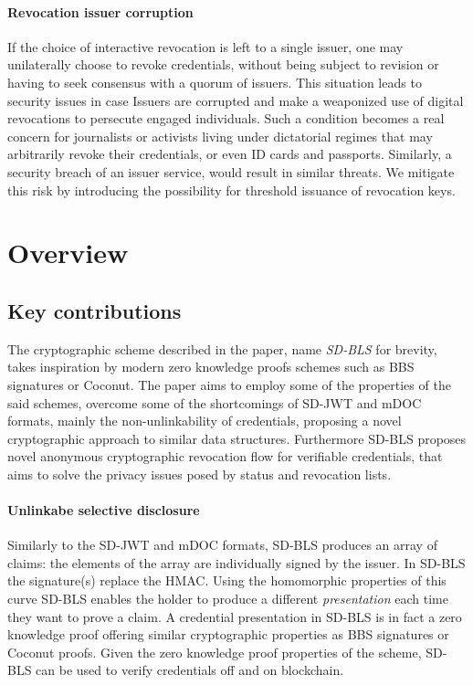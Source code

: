 \documentclass[conference]{IEEEtran}
\begin{document}


\paragraph{Revocation issuer corruption}

If the choice of interactive revocation is left to a single issuer, one may unilaterally choose to revoke credentials, without being subject to revision or having to seek consensus with a quorum of issuers. This situation leads to security issues in case Issuers are corrupted and make a weaponized use of digital revocations to persecute engaged individuals. Such a condition becomes a real concern for journalists or activists living under dictatorial regimes that may arbitrarily revoke their credentials, or even ID cards and passports. Similarly, a security breach of an issuer service, would result in similar threats. We mitigate this risk by introducing the possibility for threshold issuance of revocation keys.

\section{Overview}

\subsection{Key contributions}
The  cryptographic scheme described in the paper, name \textit{SD-BLS} for brevity,  takes inspiration by modern zero knowledge proofs schemes  such as \cite{bbs+}BBS signatures or Coconut\cite{coconut}.  The paper aims to employ some of the properties of the said schemes, overcome some of the shortcomings of  SD-JWT and mDOC formats, mainly the non-unlinkability of credentials, proposing a novel cryptographic approach to similar data structures. Furthermore SD-BLS proposes novel anonymous cryptographic revocation flow for verifiable credentials, that aims to solve the privacy issues posed by status and revocation lists.

\paragraph{Unlinkabe selective disclosure}
Similarly to the SD-JWT and mDOC formats, SD-BLS produces an array of claims:  the elements of the array are individually signed by the issuer. In SD-BLS the signature(s) replace the HMAC. Using the homomorphic properties of this curve SD-BLS enables the holder to produce a different \textit{presentation} each time they want to prove a claim. A credential presentation in SD-BLS is in fact a zero knowledge proof offering similar cryptographic properties as \cite{bbs+}BBS signatures or Coconut\cite{coconut} proofs. Given the zero knowledge proof properties of the scheme, SD-BLS can be used to verify credentials off and on blockchain.
\end{document}
